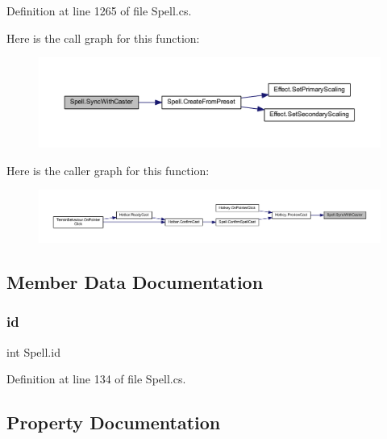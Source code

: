 Definition at line 1265 of file Spell.\+cs.

Here is the call graph for this function\+:
\nopagebreak
\begin{figure}[H]
\begin{center}
\leavevmode
\includegraphics[width=350pt]{class_spell_a65c49405edc86456dfdace46c81b1530_cgraph}
\end{center}
\end{figure}
Here is the caller graph for this function\+:
\nopagebreak
\begin{figure}[H]
\begin{center}
\leavevmode
\includegraphics[width=350pt]{class_spell_a65c49405edc86456dfdace46c81b1530_icgraph}
\end{center}
\end{figure}


\subsection{Member Data Documentation}
\mbox{\label{class_spell_abb6d2a96c06ac7e85d1e315e257a106a}} 
\subsubsection{\texorpdfstring{id}{id}}
{\footnotesize\ttfamily int Spell.\+id}



Definition at line 134 of file Spell.\+cs.



\subsection{Property Documentation}
\mbox{\label{class_spell_a682bd6dfb1e3dd20ef44711ca10c0f05}} 
